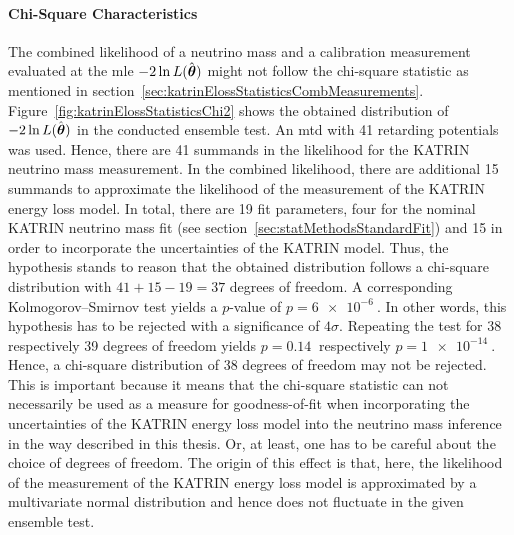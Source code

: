 \paragraph{Chi-Square Characteristics}
The combined likelihood of a neutrino mass and a calibration measurement evaluated at the \gls{mle} $-2\ln L(\hat{\boldsymbol{\mathbf{\theta}}})$ might not follow the chi-square statistic as mentioned in section~\ref{sec:katrinElossStatisticsCombMeasurements}. Figure~\ref{fig:katrinElossStatisticsChi2} shows the obtained distribution of $-2\ln L(\hat{\boldsymbol{\mathbf{\theta}}})$ in the conducted ensemble test. An \gls{mtd} with 41 retarding potentials was used. Hence, there are 41 summands in the likelihood for the KATRIN neutrino mass measurement. In the combined likelihood, there are additional 15 summands to approximate the likelihood of the measurement of the KATRIN energy loss model. In total, there are 19 fit parameters, four for the nominal KATRIN neutrino mass fit (see section~\ref{sec:statMethodsStandardFit}) and 15 in order to incorporate the uncertainties of the KATRIN model. Thus, the hypothesis stands to reason that the obtained distribution follows a chi-square distribution with $41+15-19=37$ degrees of freedom. A corresponding Kolmogorov–Smirnov test yields a $p$-value of $p=\SI{6e-6}{}$. In other words, this hypothesis has to be rejected with a significance of $4\sigma$. Repeating the test for 38 respectively 39 degrees of freedom yields $p=\SI{0.14}{}$ respectively $p=\SI{1e-14}{}$. Hence, a chi-square distribution of 38 degrees of freedom may not be rejected. This is important because it means that the chi-square statistic can not necessarily be used as a measure for goodness-of-fit when incorporating the uncertainties of the KATRIN energy loss model into the neutrino mass inference in the way described in this thesis. Or, at least, one has to be careful about the choice of degrees of freedom. The origin of this effect is that, here, the likelihood of the measurement of the KATRIN energy loss model is approximated by a multivariate normal distribution and hence does not fluctuate in the given ensemble test.

